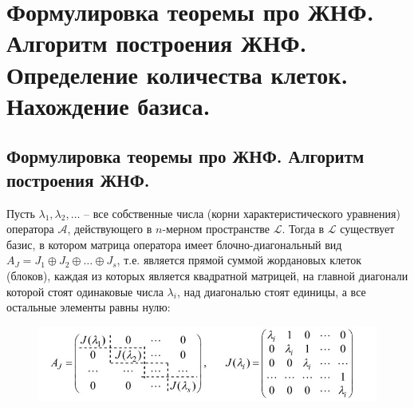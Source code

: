\section{
    Формулировка теоремы про ЖНФ. Алгоритм построения ЖНФ. Определение количества клеток. Нахождение базиса. 
}

\subsection{
    Формулировка теоремы про ЖНФ. Алгоритм построения ЖНФ.
}

\begin{theorem}
    Пусть $\lambda_1, \lambda_2, \ldots$ – все собственные числа (корни характеристического уравнения) оператора $\mathscr{A}$, действующего в $n$-мерном пространстве $\mathcal{L}$. Тогда в $\mathcal{L}$ существует базис, в котором матрица оператора имеет блочно-диагональный вид $A_J = J_1 \oplus J_2 \oplus \ldots \oplus J_s$, т.е. является прямой суммой жордановых клеток (блоков), каждая из которых является квадратной матрицей, на главной диагонали которой стоят одинаковые числа $\lambda_i$, над диагональю стоят единицы, а все остальные элементы равны нулю:

    \begin{figure}[H]
        \centering
        \includegraphics[scale=0.7]{images/27_1.jpg}
        \label{fig:picture_27_1}
    \end{figure} 
\end{theorem}

